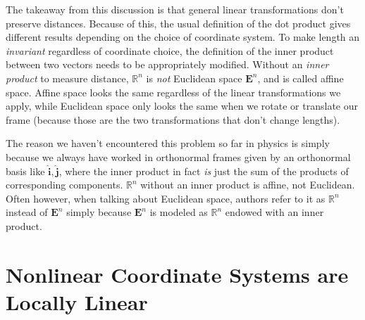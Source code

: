 \documentclass[../master.tex]{subfiles}
\begin{document}
	The takeaway from this discussion is that general linear transformations don't preserve distances. Because of this, the usual definition of the dot product gives different results depending on the choice of coordinate system. To make length an \emph{invariant} regardless of coordinate choice, the definition of the inner product between two vectors needs to be appropriately modified. Without an \emph{inner product} to measure distance, $\mathbb{R}^n$ is \emph{not} Euclidean space $\mathbf{E}^n$, and is called affine space. Affine space looks the same regardless of the linear transformations we apply, while Euclidean space only looks the same when we rotate or translate our frame (because those are the two transformations that don't change lengths). 
	
	The reason we haven't encountered this problem so far in physics is simply because we always have worked in orthonormal frames given by an orthonormal basis like $\hat{\mathbf{i}}, \hat{\mathbf{j}}$, where the inner product in fact \emph{is} just the sum of the products of corresponding components. $\mathbb{R}^n$ without an inner product is affine, not Euclidean. Often however, when talking about Euclidean space, authors refer to it as $\mathbb{R}^n$ instead of $\mathbf{E}^n$ simply because $\mathbf{E}^n$ is modeled as $\mathbb{R}^n$ endowed with an inner product.
	
	


	\section[Nonlinear Coordinate Systems are Locally Linear]{Nonlinear Coordinate Systems are\\ Locally Linear}%
	\label{sec:nonlinear_coordinate_systems_are_locally_linear}
	
\end{document}
